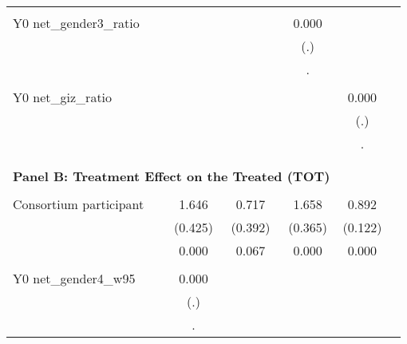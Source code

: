 \begin{table}[!h]
\begin{adjustbox}{width=\columnwidth,center}
\begin{tabular}{l*{5}{c}}
                    &                     &                     &                     &                     \\
Y0 net\_gender3\_ratio&                     &                     &       0.000         &                     \\
                    &                     &                     &         (.)         &                     \\
                    &                     &                     &           .         &                     \\
                    &                     &                     &                     &                     \\
Y0 net\_giz\_ratio    &                     &                     &                     &       0.000         \\
                    &                     &                     &                     &         (.)         \\
                    &                     &                     &                     &           .         \\
                    &                     &                     &                     &                     \\
\hline \\ \multicolumn{4}{c}{\textbf{Panel B: Treatment Effect on the Treated (TOT)}} \\\\[-1ex]
Consortium participant&       1.646\sym{***}&       0.717\sym{*}  &       1.658\sym{***}&       0.892\sym{***}\\
                    &     (0.425)         &     (0.392)         &     (0.365)         &     (0.122)         \\
                    &       0.000         &       0.067         &       0.000         &       0.000         \\
                    &                     &                     &                     &                     \\
Y0 net\_gender4\_w95  &       0.000         &                     &                     &                     \\
                    &         (.)         &                     &                     &                     \\
                    &           .         &                     &                     &                     \\

\end{tabular}
\end{adjustbox}
\end{table}
